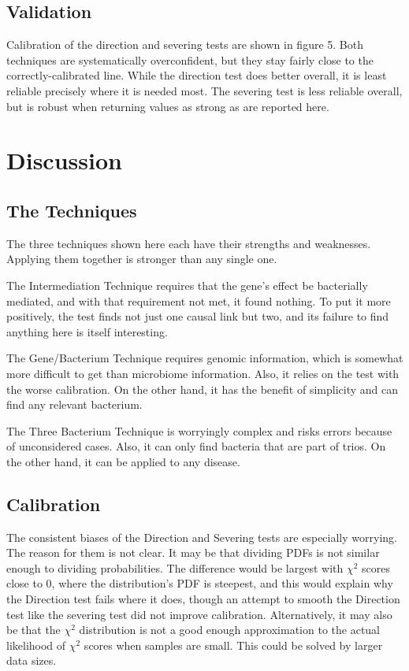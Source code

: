 \documentclass[a4paper]{article}
\begin{document}
\subsection{Validation}

Calibration of the direction and severing tests are shown in figure
5.  Both techniques are systematically overconfident, but they stay
fairly close to the
correctly-calibrated line.  While the direction test does better
overall, it is least reliable precisely where it is needed most.  The
severing test is less reliable overall, but is robust when
returning values as strong as are reported here.

\section{Discussion}

\subsection{The Techniques}

The three techniques shown here each have their strengths and
weaknesses.  Applying them together is stronger than any single one.

The Intermediation Technique requires that the gene's effect be
bacterially mediated, and with that requirement not met, it found
nothing.  To put it more positively, the test finds not just one
causal link but two, and its failure to find anything here is itself
interesting.

The Gene/Bacterium Technique requires genomic information, which is
somewhat more difficult to get than microbiome
information.  Also, it relies on the test with the worse calibration.
On the other hand, it has the benefit of simplicity and can find any
relevant bacterium.

The Three Bacterium Technique is worryingly complex and risks errors
because of unconsidered cases.  Also, it can only find bacteria that
are part of trios.  On the other hand, it can be applied to any
disease.

\subsection{Calibration}

The consistent biases of the Direction and Severing tests are
especially worrying.  The reason for them is not clear.  It may be
that dividing PDFs is not similar enough to dividing probabilities.
The difference would be largest with $\chi^2$ scores close to 0, where
the distribution's PDF is steepest, and this would explain why the
Direction test fails where it does, though an attempt to smooth the
Direction test like the severing test did not improve calibration.
Alternatively, it may also be that the $\chi^2$ distribution is not a
good enough approximation to the actual likelihood of $\chi^2$ scores
when samples are small.  This could be solved by larger data sizes.
\end{document}
